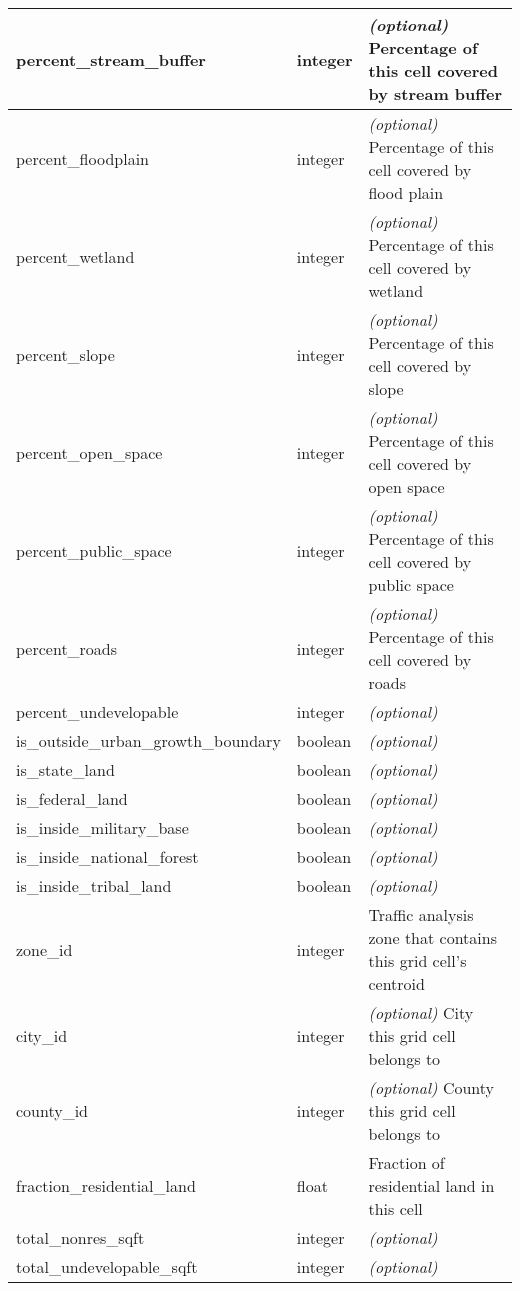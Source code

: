 \begin{tabular}{p{2in}lp{3.5in}}
\hline
percent_stream_buffer & integer & \emph{(optional) } Percentage of this cell covered by stream buffer  \\
\hline
percent_floodplain & integer & \emph{(optional) } Percentage of this cell covered by flood plain  \\
\hline
percent_wetland & integer & \emph{(optional) } Percentage of this cell covered by wetland  \\
\hline
percent_slope & integer & \emph{(optional) } Percentage of this cell covered by slope  \\
\hline
percent_open_space & integer & \emph{(optional) } Percentage of this cell covered by open space  \\
\hline
percent_public_space & integer & \emph{(optional) } Percentage of this cell covered by public space  \\
\hline
percent_roads & integer & \emph{(optional) } Percentage of this cell covered by roads  \\
\hline
percent_undevelopable & integer & \emph{(optional) }
\\
\hline
is_outside_urban_growth_boundary & boolean & \emph{(optional) } \\
\hline
is_state_land & boolean & \emph{(optional) }
\\
\hline
is_federal_land & boolean & \emph{(optional) }
\\
\hline
is_inside_military_base & boolean & \emph{(optional) }
\\
\hline
is_inside_national_forest & boolean & \emph{(optional) }
\\
\hline
is_inside_tribal_land & boolean & \emph{(optional) }
\\
\hline
zone_id & integer & Traffic analysis zone that contains this grid cell's centroid  \\
\hline
city_id & integer & \emph{(optional) } City this grid cell belongs to  \\
\hline
county_id & integer & \emph{(optional) } County this grid cell belongs to  \\
\hline
fraction_residential_land & float & Fraction of residential land in this cell  \\
\hline
total_nonres_sqft & integer & \emph{(optional) }
\\
\hline
total_undevelopable_sqft & integer & \emph{(optional) }
\\
\hline

\end{tabular}

